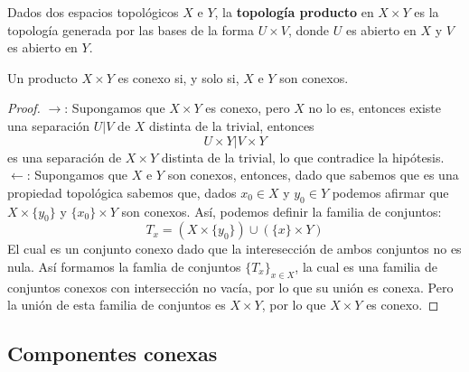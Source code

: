 \begin{definición}
    Dados dos espacios topológicos $X$ e $Y$, la \textbf{topología producto} en $X \times Y$ es la topología generada por las bases de la forma $U \times V$, donde $U$ es abierto en $X$ y $V$ es abierto en $Y$.
\end{definición}
\begin{proposición}
    Un producto $X \times Y$ es conexo si, y solo si, $X$ e $Y$ son conexos.
\end{proposición}
\begin{proof}
    $\rightarrow$: Supongamos que $X \times Y$ es conexo, pero $X$ no lo es, entonces existe una separación $U|V$ de $X$ distinta de la trivial, entonces $$U \times Y | V \times Y$$ es una separación de $X \times Y$ distinta de la trivial, lo que contradice la hipótesis.\\
    $\leftarrow$: Supongamos que $X$ e $Y$ son conexos, entonces, dado que sabemos que es una propiedad topológica sabemos que, dados $x_0 \in X$ y $y_0 \in Y$ podemos afirmar que $X \times \{y_0\}$ y $\{x_0\} \times Y$ son conexos. Así, podemos definir la familia de conjuntos: 
    $$T_x = (X \times \{y_0\}) \cup (\{x\} \times Y)$$
    El cual es un conjunto conexo dado que la interesección de ambos conjuntos no es nula. Así formamos la famlia de conjuntos $\{T_x\}_{x \in X}$, la cual es una familia de conjuntos conexos con intersección no vacía, por lo que su unión es conexa. Pero la unión de esta familia de conjuntos es $X \times Y$, por lo que $X \times Y$ es conexo.
\end{proof}

\subsection{Componentes conexas}

